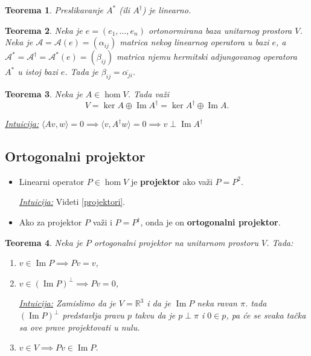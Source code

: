 \documentclass[a4paper,12pt,twoside]{report}
\newtheorem{theorem}{Teorema}[section]
\numberwithin{algorithm}{section}
\begin{document}
\begin{theorem}
    Preslikavanje $A^*$ (ili $A^\dagger$) je linearno.
\end{theorem}

\begin{theorem}
    Neka je $e = (e_1, \dots, e_n)$ ortonormirana baza unitarnog prostora $V$. Neka je $\mathcal{A} = \mathcal{A}(e) = (\alpha_{ij})$ matrica nekog
    linearnog operatora u bazi $e$, a \linebreak $\mathcal{A}^* = \mathcal{A}^\dagger = \mathcal{A}^*(e) = (\beta_{ij})$ matrica njemu hermitski 
    adjungovanog operatora $A^*$ u istoj bazi $e$. Tada je $\beta_{ij} = \overline{\alpha_{ji}}$.
\end{theorem}

\begin{theorem}
    Neka je $A \in \hom V$. Tada važi
    \[ V = \ker A \oplus \operatorname{Im}A^\dagger = \ker A^\dagger \oplus \operatorname{Im}A. \]
\end{theorem}
\noindent\underline{\textit{Intuicija:}} $\langle Av, w \rangle = 0 \implies \langle v, A^\dagger w \rangle = 0 \implies v \perp \operatorname{Im}A^\dagger$

\subsection{Ortogonalni projektor}

\begin{itemize}
    \item Linearni operator $P \in \hom V$ je \textbf{projektor} ako važi $P = P^2$.
    
    \noindent\underline{\textit{Intuicija:}} Videti \ref{projektori}.
    \item Ako za projektor $P$ važi i $P = P^\dagger$, onda je on \textbf{ortogonalni projektor}.
\end{itemize}

\begin{theorem}
    Neka je $P$ ortogonalni projektor na unitarnom prostoru $V$. Tada:
    \begin{enumerate}
        \item $v \in \operatorname{Im}P \implies Pv = v$,
        
        \item $v \in (\operatorname{Im}P)^\perp \implies Pv = 0$,
        
        \noindent\underline{\textit{Intuicija:}} Zamislimo da je $V = \mathbb{R}^3$ i da je $\operatorname{Im}P$ neka ravan $\pi$.
        tada $(\operatorname{Im}P)^\perp$ predstavlja pravu $p$ takvu da je $p \perp \pi$ i $0 \in p$, pa će se svaka tačka sa ove prave
        projektovati u nulu.
        \item $v \in V \implies Pv \in \operatorname{Im}P$.
    \end{enumerate}
\end{theorem}
\end{document}
